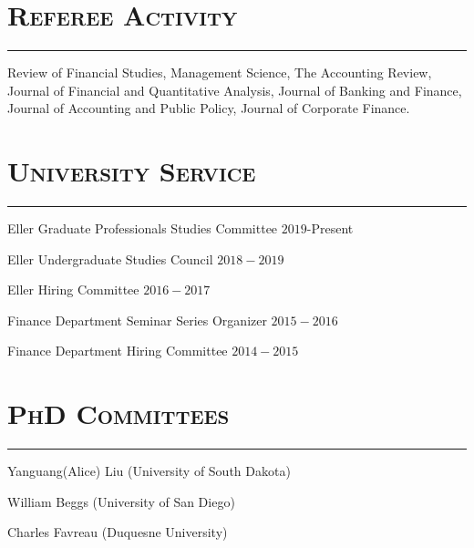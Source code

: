 \documentclass[10pt,letterpaper]{article}
\renewenvironment{itemize}{
  \begin{list}{}{
    \setlength{\leftmargin}{1.5em}
    \setlength{\itemsep}{0.25em}
    \setlength{\parskip}{0pt}
    \setlength{\parsep}{0.25em}
  }
}{
  \end{list}
}
\begin{document}
\section*{\textsc{Referee Activity}}
\nointerlineskip
\vspace{-3mm}
\rule{\textwidth}{0.5mm}

\begin{itemize}
\item Review of Financial Studies, Management Science, The Accounting Review, Journal of Financial and Quantitative Analysis, Journal of Banking and Finance, Journal of Accounting and Public Policy, Journal of Corporate Finance.
\end{itemize}

\section*{\textsc{University Service}}
\nointerlineskip
\vspace{-3mm}
\rule{\textwidth}{0.5mm}

\begin{itemize}
\item Eller Graduate Professionals Studies Committee \hfill $2019$-Present
\item Eller Undergraduate Studies Council \hfill $2018-2019$
\item Eller Hiring Committee \hfill $2016-2017$
\item Finance Department Seminar Series Organizer \hfill $2015-2016$
\item Finance Department Hiring Committee \hfill $2014-2015$
\end{itemize}

\section*{\textsc{PhD Committees}}
\nointerlineskip
\vspace{-3mm}
\rule{\textwidth}{0.5mm}

\begin{itemize}
\item Yanguang(Alice) Liu (University of South Dakota)
\end{itemize}

\begin{itemize}
\item William Beggs (University of San Diego)
\end{itemize}

\begin{itemize}
\item Charles Favreau (Duquesne University)
\end{itemize}
\end{document}
